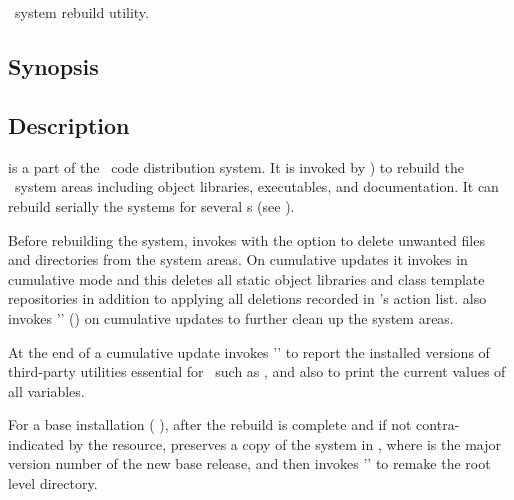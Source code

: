 
\newpage
\section{}
\label{sneeze}

\aipspp\ system rebuild utility.

\subsection*{Synopsis}

\begin{synopsis}
\end{synopsis}

\subsection*{Description}

 is a part of the \aipspp\ code distribution system.  It is
invoked by ) to rebuild the \aipspp\ system areas
including object libraries, executables, and documentation.  It can rebuild
serially the systems for several s (see ).

Before rebuilding the system,  invokes 
with the  option to delete unwanted files and directories from
the system areas.  On cumulative updates it invokes 
in cumulative mode and this deletes all static object libraries and class
template repositories in addition to applying all deletions recorded in
's action list.   also invokes
'' () on cumulative updates
to further clean up the system areas.

At the end of a cumulative update  invokes
'' to report the installed
versions of third-party utilities essential for \aipspp\ such as
, and also to print the current values of all 
variables.

For a base installation ( ), after the rebuild is complete
and if not contra-indicated by the 
resource,  preserves a copy of the system in
, where  is the major version number of
the new base release, and then invokes
'' to remake
the root level directory.

